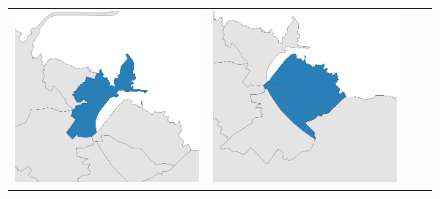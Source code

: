 \begin{figure}[p]
\begin{tabularx}{1\textwidth}{XXXX}
\includegraphics[width=1\linewidth]{images/ch6/mergefocus/01}&
\includegraphics[width=1\linewidth]{images/ch6/mergefocus/02}&

\end{tabularx}
\end{figure}

